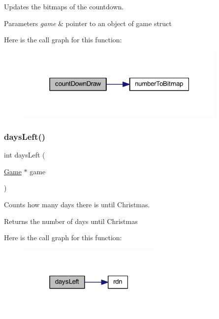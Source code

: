 Updates the bitmaps of the countdown. 


\begin{DoxyParams}{Parameters}
{\em game} & pointer to an object of game struct \\
\hline
\end{DoxyParams}
Here is the call graph for this function\+:
\nopagebreak
\begin{figure}[H]
\begin{center}
\leavevmode
\includegraphics[width=292pt]{group___graphics_gaadff1c974f62a2b8f18fde71535809fb_cgraph}
\end{center}
\end{figure}
\mbox{\label{group___graphics_ga16779210d6883bbec22aaed4546c2738}} 
\subsubsection{\texorpdfstring{days\+Left()}{daysLeft()}}
{\footnotesize\ttfamily int days\+Left (\begin{DoxyParamCaption}\item[{\hyperlink{struct_game}{Game} $\ast$}]{game }\end{DoxyParamCaption})}



Counts how many days there is until Christmas. 

\begin{DoxyReturn}{Returns}
the number of days until Christmas 
\end{DoxyReturn}
Here is the call graph for this function\+:
\nopagebreak
\begin{figure}[H]
\begin{center}
\leavevmode
\includegraphics[width=199pt]{group___graphics_ga16779210d6883bbec22aaed4546c2738_cgraph}
\end{center}
\end{figure}
\mbox{\label{group___graphics_gabde7c0fefaf3424db78158c805037cd3}} 
